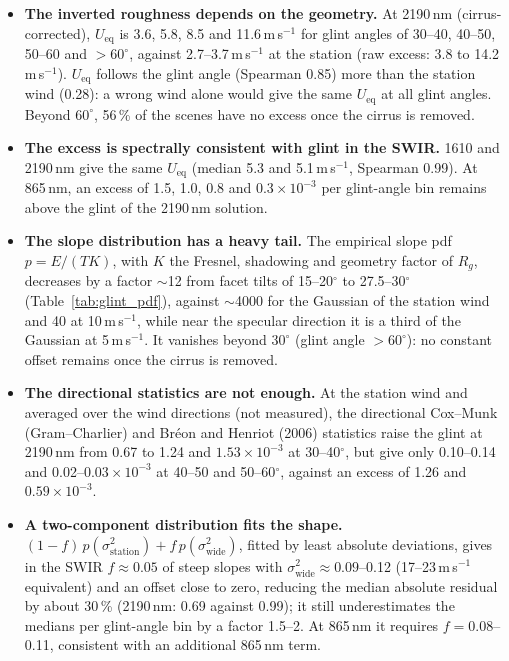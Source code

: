 \documentclass[11pt,a4paper]{article}
\begin{document}
\begin{itemize}
\item \textbf{The inverted roughness depends on the geometry.} At 2190\,nm (cirrus-corrected), $U_\mathrm{eq}$ is
  3.6, 5.8, 8.5 and 11.6\,m\,s$^{-1}$ for glint angles of 30--40, 40--50, 50--60 and $>60^\circ$, against
  2.7--3.7\,m\,s$^{-1}$ at the station (raw excess: 3.8 to 14.2\,m\,s$^{-1}$). $U_\mathrm{eq}$ follows the glint
  angle (Spearman 0.85) more than the station wind (0.28): a wrong wind alone would give the same $U_\mathrm{eq}$
  at all glint angles. Beyond $60^\circ$, 56\,\% of the scenes have no excess once the cirrus is removed.
\item \textbf{The excess is spectrally consistent with glint in the SWIR.} 1610 and 2190\,nm give the same
  $U_\mathrm{eq}$ (median 5.3 and 5.1\,m\,s$^{-1}$, Spearman 0.99). At 865\,nm, an excess of 1.5, 1.0, 0.8 and
  $0.3\times10^{-3}$ per glint-angle bin remains above the glint of the 2190\,nm solution.
\item \textbf{The slope distribution has a heavy tail.} The empirical slope pdf $p = E/(T K)$, with $K$ the Fresnel,
  shadowing and geometry factor of $R_g$, decreases by a factor $\sim$12 from facet tilts of 15--20$^\circ$ to
  27.5--30$^\circ$ (Table~\ref{tab:glint_pdf}), against $\sim$4000 for the Gaussian of the station wind and 40
  at 10\,m\,s$^{-1}$, while near the specular direction it is a third of the Gaussian at 5\,m\,s$^{-1}$. It
  vanishes beyond $30^\circ$ (glint angle $>60^\circ$): no constant offset remains once the cirrus is removed.
\item \textbf{The directional statistics are not enough.} At the station wind and averaged over the wind
  directions (not measured), the directional Cox--Munk (Gram--Charlier) and Bréon and Henriot (2006) statistics
  raise the glint at 2190\,nm from 0.67 to 1.24 and $1.53\times10^{-3}$ at 30--40$^\circ$, but give only 0.10--0.14
  and 0.02--$0.03\times10^{-3}$ at 40--50 and 50--60$^\circ$, against an excess of 1.26 and $0.59\times10^{-3}$.
\item \textbf{A two-component distribution fits the shape.} $(1-f)\,p(\sigma^2_\mathrm{station}) +
  f\,p(\sigma^2_\mathrm{wide})$, fitted by least absolute deviations, gives in the SWIR $f\approx0.05$ of steep
  slopes with $\sigma^2_\mathrm{wide}\approx0.09$--0.12 (17--23\,m\,s$^{-1}$ equivalent) and an offset close to
  zero, reducing the median absolute residual by about 30\,\% (2190\,nm: 0.69 against 0.99); it still
  underestimates the medians per glint-angle bin by a factor 1.5--2. At 865\,nm it requires $f = 0.08$--0.11,
  consistent with an additional 865\,nm term.
\end{itemize}
\end{document}
